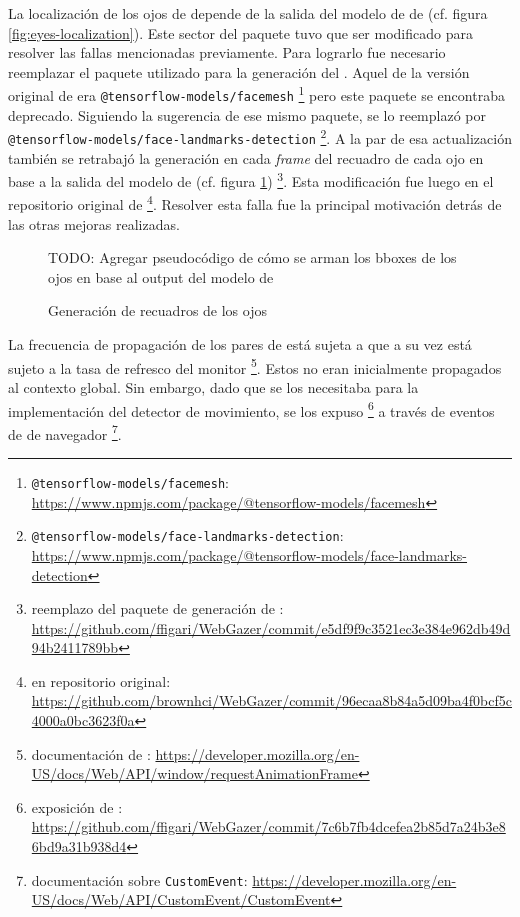   La localización de los ojos de \webgazer depende de la salida del modelo de
  \facemesh de \tfjs (cf. figura \ref{fig:eyes-localization}).
  Este sector del paquete tuvo que ser modificado para resolver las fallas
  mencionadas previamente.
  Para lograrlo fue necesario reemplazar el paquete utilizado para la generación
  del \facemesh.
  Aquel de la versión original de \webgazer era
  \texttt{@tensorflow-models/facemesh}
  \footnote{\texttt{@tensorflow-models/facemesh}:
  \url{https://www.npmjs.com/package/@tensorflow-models/facemesh}} pero este
  paquete se encontraba deprecado.
  Siguiendo la sugerencia de ese mismo paquete, se lo reemplazó por
  \texttt{@tensorflow-models/face-landmarks-detection}
  \footnote{\texttt{@tensorflow-models/face-landmarks-detection}:
  \url{https://www.npmjs.com/package/@tensorflow-models/face-landmarks-detection}}.
  A la par de esa actualización también se retrabajó la generación en cada
  \textit{frame} del recuadro de cada ojo en base a la salida del modelo de
  \facemesh (cf. figura \ref{fig:facemesh-to-eyes-bbox}) \footnote{reemplazo del
  paquete de generación de \facemesh:
  \url{https://github.com/ffigari/WebGazer/commit/e5df9f9c3521ec3e384e962db49d94b2411789bb}}.
  Esta modificación fue luego \mergeada en el repositorio original de \webgazer
  \footnote{\merge en repositorio original:
  \url{https://github.com/brownhci/WebGazer/commit/96ecaa8b84a5d09ba4f0bcf5c4000a0bc3623f0a}}.
  Resolver esta falla fue la principal motivación detrás de las otras mejoras
  realizadas.

  \begin{figure}
    TODO: Agregar pseudocódigo de cómo se arman los bboxes de los ojos en base al
          output del modelo de \facemesh

    \caption{Generación de recuadros de los ojos}
    \label{fig:facemesh-to-eyes-bbox}
  \end{figure}

  La frecuencia de propagación de los pares de \features está sujeta a \raf que a
  su vez está sujeto a la tasa de refresco del monitor \footnote{documentación de
  \raf:
  \url{https://developer.mozilla.org/en-US/docs/Web/API/window/requestAnimationFrame}}.
  Estos \features no eran inicialmente propagados al contexto global.
  Sin embargo, dado que se los necesitaba para la implementación del detector de
  movimiento, se los expuso \footnote{exposición de \features:
  \url{https://github.com/ffigari/WebGazer/commit/7c6b7fb4dcefea2b85d7a24b3e86bd9a31b938d4}}
  a través de eventos de \js de navegador \footnote{documentación sobre
  \texttt{CustomEvent}:
  \url{https://developer.mozilla.org/en-US/docs/Web/API/CustomEvent/CustomEvent}}.

